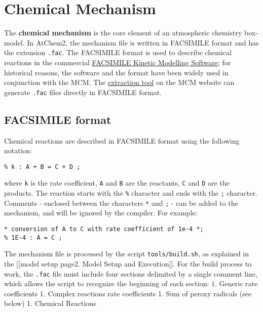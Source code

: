 \section{Chemical Mechanism} \label{sec:mechanism}

The \textbf{chemical mechanism} is the core element of an atmospheric
chemistry box-model. In AtChem2, the mechanism file is written in
FACSIMILE format and has the extension \texttt{.fac}. The FACSIMILE
format is used to describe chemical reactions in the commercial
\href{http://www.mcpa-software.com/}{FACSIMILE Kinetic Modelling
Software}; for historical reasons, the software and the format have been
widely used in conjunction with the MCM. The
\href{http://mcm.leeds.ac.uk/MCMv3.3.1/extract.htt}{extraction tool} on
the MCM website can generate \texttt{.fac} files directly in FACSIMILE
format.

\hypertarget{facsimile-format}{%
\subsection{FACSIMILE format}\label{facsimile-format}}

Chemical reactions are described in FACSIMILE format using the following
notation:

\begin{verbatim}
% k : A + B = C + D ;
\end{verbatim}

where \texttt{k} is the rate coefficient, \texttt{A} and \texttt{B} are
the reactants, \texttt{C} and \texttt{D} are the products. The reaction
starts with the \texttt{\%} character and ends with the \texttt{;}
character. Comments - enclosed between the characters \texttt{*} and
\texttt{;} - can be added to the mechanism, and will be ignored by the
compiler. For example:

\begin{verbatim}
* conversion of A to C with rate coefficient of 1e-4 *;
% 1E-4 : A = C ;
\end{verbatim}

The mechanism file is processed by the script \texttt{tools/build.sh},
as explained in the {[}{[}model setup page\textbar{}2. Model Setup and
Execution{]}{]}. For the build process to work, the \texttt{.fac} file
must include four sections delimited by a single comment line, which
allows the script to recognize the beginning of each section: 1. Generic
rate coefficients 1. Complex reactions rate coefficients 1. Sum of
peroxy radicals (see below) 1. Chemical Reactions

